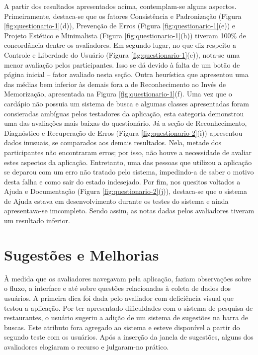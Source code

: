 A partir dos resultados apresentados acima, contemplam-se alguns aspectos. Primeiramente, destaca-se que os fatores Consistência e Padronização (Figura \ref{fig:questionario-1}(d)), Prevenção de Erros (Figura \ref{fig:questionario-1}(e)) e Projeto Estético e Minimalista (Figura \ref{fig:questionario-1}(h)) tiveram 100\% de concordância dentre os avaliadores. Em segundo lugar, no que diz respeito a Controle e Liberdade do Usuário (Figura \ref{fig:questionario-1}(c)), nota-se uma menor avaliação pelos participantes. Isso se dá devido à falta de um botão de página inicial -- fator avaliado nesta seção. Outra heurística que apresentou uma das médias bem inferior às demais fora a de Reconhecimento ao Invés de Memorização, apresentada na Figura \ref{fig:questionario-1}(f). Uma vez que o cardápio não possuia um sistema de busca e algumas classes apresentadas foram consieradas ambíguas pelos testadores da aplicação, esta categoria demonstrou uma das avaliações mais baixas do questionário. Já a seção de Reconhecimento, Diagnóstico e Recuperação de Erros (Figura \ref{fig:questionario-2}(i)) apresentou dados inusuais, se comparados aos demais resultados. Nela, metade dos participantes não encontraram erros; por isso, não houve a necessidade de avaliar estes aspectos da aplicação. Entretanto, uma das pessoas que utilizou a aplicação se deparou com um erro não tratado pelo sistema, impedindo-a de saber o motivo desta falha e como sair do estado indesejado. Por fim, nos quesitos voltados a Ajuda e Documentação (Figura \ref{fig:questionario-2}(j)), destaca-se que o sistema de Ajuda estava em desenvolvimento durante os testes do sistema e ainda apresentava-se imcompleto. Sendo assim, as notas dadas pelos avaliadores tiveram um resultado inferior.

\section{\label{sec:sugestoes}Sugestões e Melhorias}

À medida que os avaliadores navegavam pela aplicação, faziam observações sobre o fluxo, a interface e até sobre questões relacionadas à coleta de dados dos usuários. A primeira dica foi dada pelo avaliador com deficiência visual que testou a aplicação. Por ter apresentado dificuldades com o sistema de pesquisa de restaurantes, o usuário sugeriu a adição de um sistema de sugestões na barra de buscas. Este atributo fora agregado ao sistema e esteve disponível a partir do segundo teste com os usuários. Após a inserção da janela de sugestões, alguns dos avaliadores elogiaram o recurso e julgaram-no prático.

